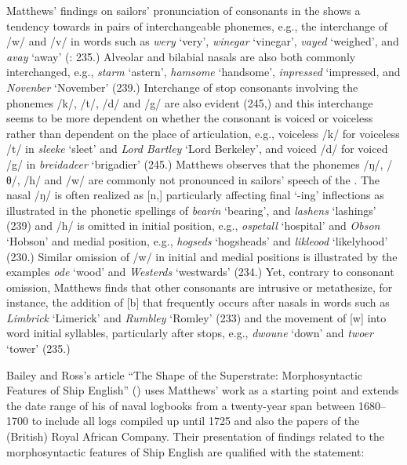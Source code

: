 Matthews’ findings on sailors’ pronunciation of consonants in the  shows a tendency towards  in pairs of interchangeable phonemes, e.g., the interchange of /w/ and /v/ in words such as \textit{wery} ‘very’, \textit{winegar} ‘vinegar’, \textit{vayed} ‘weighed’, and \textit{avay} ‘away’ (\citealt{Matthews1935}: 235.) Alveolar and bilabial nasals are also both commonly interchanged, e.g., \textit{starm} ‘astern’, \textit{hamsome} ‘handsome’, \textit{inpressed} ‘impressed, and \textit{Novenber} ‘November’ (239.) Interchange of stop consonants involving the phonemes /k/, /t/, /d/ and /g/ are also evident (245,) and this interchange seems to be more dependent on whether the consonant is voiced or voiceless rather than dependent on the place of articulation, e.g., voiceless /k/ for voiceless /t/ in \textit{sleeke} ‘sleet’ and \textit{Lord Bartley} ‘Lord Berkeley’, and voiced /d/ for voiced /g/ in \textit{breidadeer} ‘brigadier’ (245.) Matthews observes that the phonemes /ŋ/, /θ/, /h/ and /w/ are commonly not pronounced in sailors’ speech of the . The nasal /ŋ/ is often realized as [n,] particularly affecting final ‘-ing’ inflections as illustrated in the phonetic spellings of \textit{bearin} ‘bearing’, and \textit{lashens} ‘lashings’ (239) and /h/ is omitted in initial position, e.g., \textit{ospetall} ‘hospital’ and \textit{Obson} ‘Hobson’ and medial position, e.g., \textit{hogseds} ‘hogsheads’ and \textit{likleood} ‘likelyhood’ (230.) Similar omission of /w/ in initial and medial positions is illustrated by the examples \textit{ode} ‘wood’ and \textit{Westerds} ‘westwards’ (234.) Yet, contrary to consonant omission, Matthews finds that other consonants are intrusive or metathesize, for instance, the addition of [b] that frequently occurs after nasals in words such as \textit{Limbrick} ‘Limerick’ and \textit{Rumbley} ‘Romley’ (233) and the movement of [w] into word initial syllables, particularly after stops, e.g., \textit{dwoune} ‘down’ and \textit{twoer} ‘tower’ (235.)

Bailey and Ross’s article “The Shape of the Superstrate: Morphosyntactic Features of Ship English” (\citeyear*{BaileyRoss1988}) uses Matthews’ work as a starting point and extends the date range of his  of naval logbooks from a twenty-year span between 1680--1700 to include all logs compiled up until 1725 and also the papers of the (British) Royal African Company. Their presentation of findings related to the morphosyntactic features of Ship English are qualified with the statement:


